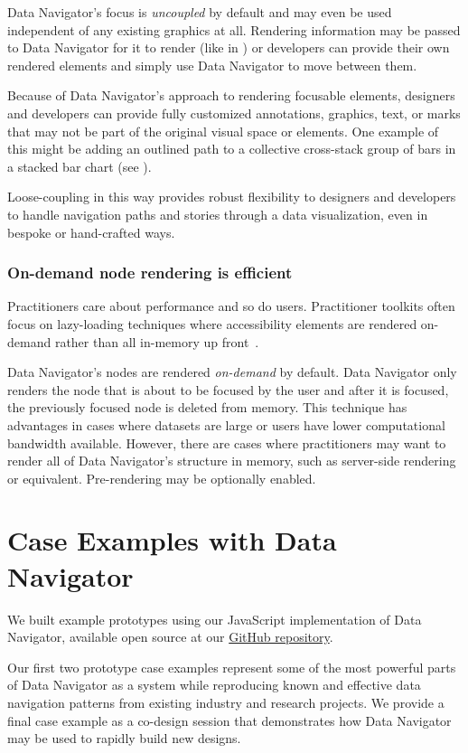 \documentclass[12pt]{cmuthesis}
\begin{document}
Data Navigator's focus is \textit{uncoupled} by default and may even be used independent of any existing graphics at all. Rendering information may be passed to Data Navigator for it to render (like in ) or developers can provide their own rendered elements and simply use Data Navigator to move between them.

Because of Data Navigator's approach to rendering focusable elements, designers and developers can provide fully customized annotations, graphics, text, or marks that may not be part of the original visual space or elements. One example of this might be adding an outlined path to a collective cross-stack group of bars in a stacked bar chart (see ).

Loose-coupling in this way provides robust flexibility to designers and developers to handle navigation paths and stories through a data visualization, even in bespoke or hand-crafted ways.

\subsubsection{On-demand node rendering is efficient}
Practitioners care about performance and so do users. Practitioner toolkits often focus on lazy-loading techniques where accessibility elements are rendered on-demand rather than all in-memory up front~\cite{Elavsky2021Method,Zong2022Rich,Blanco2022olli}.

Data Navigator's nodes are rendered \textit{on-demand} by default. Data Navigator only renders the node that is about to be focused by the user and after it is focused, the previously focused node is deleted from memory. This technique has advantages in cases where datasets are large or users have lower computational bandwidth available. However, there are cases where practitioners may want to render all of Data Navigator's structure in memory, such as server-side rendering or equivalent. Pre-rendering may be optionally enabled.

\section{Case Examples with Data Navigator}
We built example prototypes using our JavaScript implementation of Data Navigator, available open source at our \href{https://github.com/cmudig/data-navigator}{GitHub repository}.

Our first two prototype case examples represent some of the most powerful parts of Data Navigator as a system while reproducing known and effective data navigation patterns from existing industry and research projects. We provide a final case example as a co-design session that demonstrates how Data Navigator may be used to rapidly build new designs.
\end{document}

